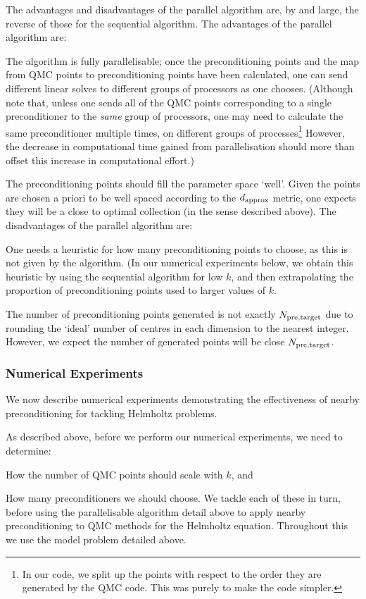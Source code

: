    The advantages and disadvantages of the parallel algorithm are, by and large, the reverse of those for the sequential algorithm. The advantages of the parallel algorithm are:
    \bit
  \item The algorithm is fully parallelisable; once the preconditioning points and the map from QMC points to preconditioning points have been calculated, one can send different linear solves to different groups of processors as one chooses. (Although note that, unless one sends all of the QMC points corresponding to a single preconditioner to the \emph{same} group of processors, one may need to calculate the same preconditioner multiple times, on different groups of processes\footnote{In our code, we split up the points with respect to the order they are generated by the QMC code. This was purely to make the code simpler.} However, the decrease in computational time gained from parallelisation should more than offset this increase in computational effort.)
    \item The preconditioning points should fill the parameter space `well'. Given the points are chosen a priori to be well spaced according to the $d_{\mathrm{approx}}$ metric, one expects they will be a close to optimal collection (in the sense described above).
      \eit
      The disadvantages of the parallel algorithm are:
      \bit
    \item One needs a heuristic for how many preconditioning points to choose, as this is not given by the algorithm. (In our numerical experiments below, we obtain this heuristic by using the sequential algorithm for low $k$, and then extrapolating the proportion of preconditioning points used to larger values of $k.$
      \item The number of preconditioning points generated is not exactly $N_{\mathrm{pre,target}}$ due to rounding the `ideal' number of centres in each dimension to the nearest integer. However, we expect the number of generated points will be close $N_{\mathrm{pre,target}}$.
      \eit


\subsubsection{Numerical Experiments}\label{sec:nbpcqmcnumerics}
We now describe numerical experiments demonstrating the effectiveness of nearby preconditioning for tackling Helmholtz problems.

As described above, before we perform our numerical experiments, we need to determine:
\bit
\item How the number of QMC points should scale with $k$, and
  \item How many preconditioners we should choose.
    \eit
    We tackle each of these in turn, before using the parallelisable algorithm detail above to apply nearby preconditioning to QMC methods for the Helmholtz equation. Throughout this  we use the model problem detailed above.

